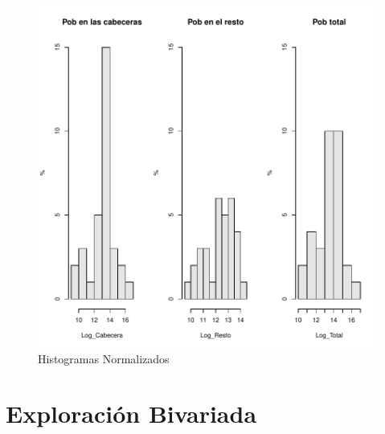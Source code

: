 \documentclass{article}
\begin{document}
\begin{figure}[h]
\centering
\begin{adjustbox}{width=12cm,height=6cm,clip,trim=0cm 0cm 0cm 0cm}
\includegraphics{Proyecto_final-HistogramaIDHNormPlot}
\end{adjustbox}
\caption{Histogramas Normalizados}
\label{histogramas_normalizados}
\end{figure}
\clearpage

\section{Exploraci\'on Bivariada}
\end{document}
